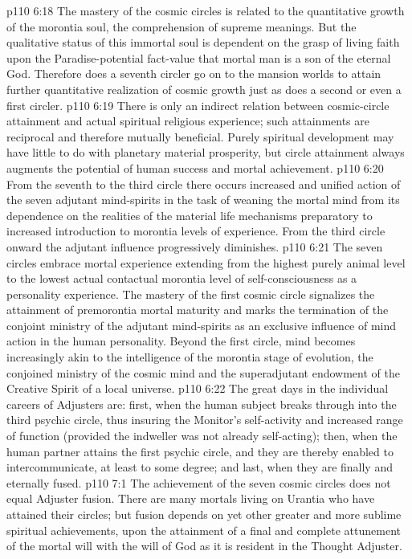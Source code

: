 \vs p110 6:18 The mastery of the cosmic circles is related to the quantitative growth of the morontia soul, the comprehension of supreme meanings. But the qualitative status of this immortal soul is  dependent on the grasp of living faith upon the Paradise\hyp{}potential fact\hyp{}value that mortal man is a son of the eternal God. Therefore does a seventh circler go on to the mansion worlds to attain further quantitative realization of cosmic growth just as does a second or even a first circler.
\vs p110 6:19 There is only an indirect relation between cosmic\hyp{}circle attainment and actual spiritual religious experience; such attainments are reciprocal and therefore mutually beneficial. Purely spiritual development may have little to do with planetary material prosperity, but circle attainment always augments the potential of human success and mortal achievement.
\vs p110 6:20 From the seventh to the third circle there occurs increased and unified action of the seven adjutant mind\hyp{}spirits in the task of weaning the mortal mind from its dependence on the realities of the material life mechanisms preparatory to increased introduction to morontia levels of experience. From the third circle onward the adjutant influence progressively diminishes.
\pc \vs p110 6:21 The seven circles embrace mortal experience extending from the highest purely animal level to the lowest actual contactual morontia level of self\hyp{}consciousness as a personality experience. The mastery of the first cosmic circle signalizes the attainment of premorontia mortal maturity and marks the termination of the conjoint ministry of the adjutant mind\hyp{}spirits as an exclusive influence of mind action in the human personality. Beyond the first circle, mind becomes increasingly akin to the intelligence of the morontia stage of evolution, the conjoined ministry of the cosmic mind and the superadjutant endowment of the Creative Spirit of a local universe.
\vs p110 6:22 The great days in the individual careers of Adjusters are: first, when the human subject breaks through into the third psychic circle, thus insuring the Monitor’s self\hyp{}activity and increased range of function (provided the indweller was not already self\hyp{}acting); then, when the human partner attains the first psychic circle, and they are thereby enabled to intercommunicate, at least to some degree; and last, when they are finally and eternally fused.
\vs p110 7:1 The achievement of the seven cosmic circles does not equal Adjuster fusion. There are many mortals living on Urantia who have attained their circles; but fusion depends on yet other greater and more sublime spiritual achievements, upon the attainment of a final and complete attunement of the mortal will with the will of God as it is resident in the Thought Adjuster.
